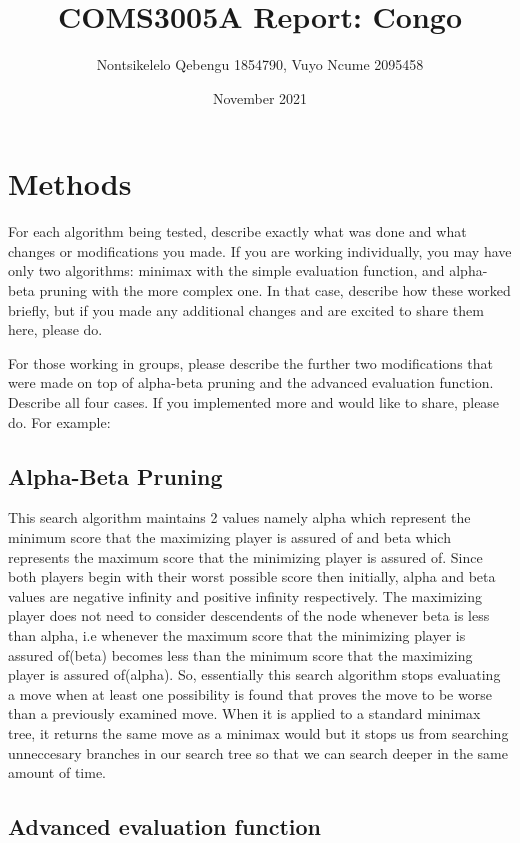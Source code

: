 \documentclass[twocolumn]{article}
\title{COMS3005A Report: Congo}
\author{Nontsikelelo Qebengu 1854790, Vuyo Ncume 2095458}
\date{November 2021}
\begin{document}
\maketitle

\section{Methods}

For each algorithm being tested, describe exactly what was done and what changes or modifications you made. If you are working individually, you may have only two algorithms: minimax with the simple evaluation function, and alpha-beta pruning with the more complex one. In that case, describe how these worked briefly, but if you made any additional changes and are excited to share them here, please do.

For those working in groups, please describe the further two modifications that were made on top of alpha-beta pruning and the advanced evaluation function. Describe all four cases. If you implemented more and would like to share, please do.
For example:

\subsection{Alpha-Beta Pruning}

This search algorithm maintains 2 values namely alpha which represent the minimum score that the maximizing player is assured of and beta which represents the maximum score that the minimizing player is assured of. Since both players begin with their worst possible score then initially, alpha and beta values are negative infinity and positive infinity respectively. The maximizing player does not need to consider descendents of the node whenever beta is less than alpha, i.e whenever the maximum score that the minimizing player is assured of(beta) becomes less than the minimum score that the maximizing player is assured of(alpha). So, essentially this search algorithm stops evaluating a move when at least one possibility is found that proves the move to be worse than a previously examined move. When it is applied to a standard minimax tree, it returns the same move as a minimax would but it stops us from searching unneccesary branches in our search tree so that we can search deeper in the same amount of time.

\subsection{Advanced evaluation function}
\end{document}
